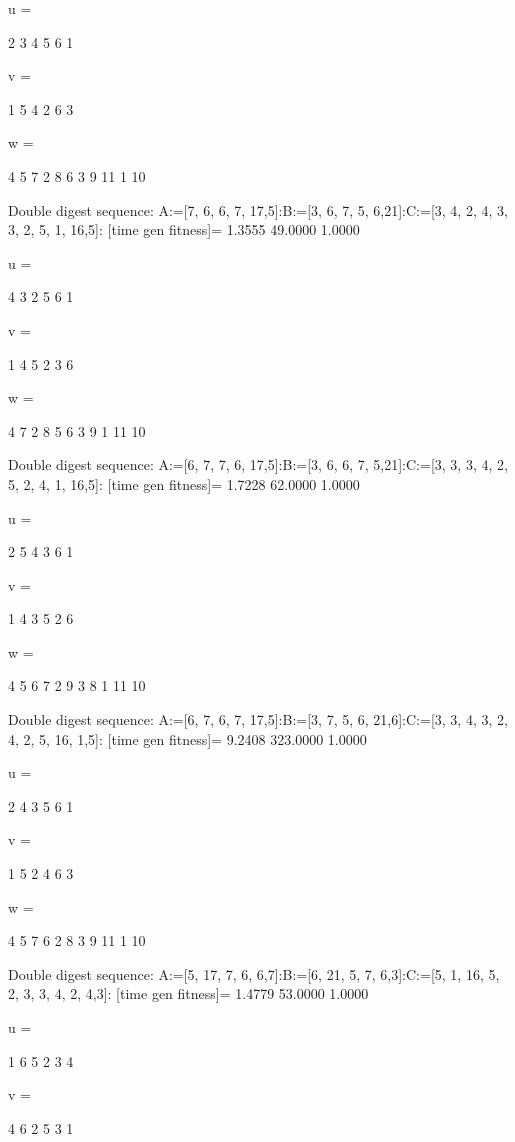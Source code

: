 u =

     2     3     4     5     6     1


v =

     1     5     4     2     6     3


w =

     4     5     7     2     8     6     3     9    11     1    10

Double digest sequence:
A:=[7, 6, 6, 7, 17,5]:B:=[3, 6, 7, 5, 6,21]:C:=[3, 4, 2, 4, 3, 3, 2, 5, 1, 16,5]:
[time gen fitness]=
    1.3555   49.0000    1.0000


u =

     4     3     2     5     6     1


v =

     1     4     5     2     3     6


w =

     4     7     2     8     5     6     3     9     1    11    10

Double digest sequence:
A:=[6, 7, 7, 6, 17,5]:B:=[3, 6, 6, 7, 5,21]:C:=[3, 3, 3, 4, 2, 5, 2, 4, 1, 16,5]:
[time gen fitness]=
    1.7228   62.0000    1.0000


u =

     2     5     4     3     6     1


v =

     1     4     3     5     2     6


w =

     4     5     6     7     2     9     3     8     1    11    10

Double digest sequence:
A:=[6, 7, 6, 7, 17,5]:B:=[3, 7, 5, 6, 21,6]:C:=[3, 3, 4, 3, 2, 4, 2, 5, 16, 1,5]:
[time gen fitness]=
    9.2408  323.0000    1.0000


u =

     2     4     3     5     6     1


v =

     1     5     2     4     6     3


w =

     4     5     7     6     2     8     3     9    11     1    10

Double digest sequence:
A:=[5, 17, 7, 6, 6,7]:B:=[6, 21, 5, 7, 6,3]:C:=[5, 1, 16, 5, 2, 3, 3, 4, 2, 4,3]:
[time gen fitness]=
    1.4779   53.0000    1.0000


u =

     1     6     5     2     3     4


v =

     4     6     2     5     3     1


